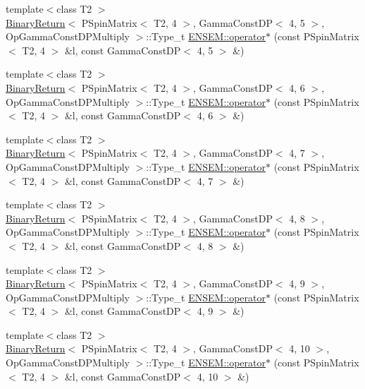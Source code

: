 \begin{DoxyCompactItemize}
\item 
{\footnotesize template$<$class T2 $>$ }\\\mbox{\hyperlink{structBinaryReturn}{Binary\+Return}}$<$ P\+Spin\+Matrix$<$ T2, 4 $>$, Gamma\+Const\+DP$<$ 4, 5 $>$, Op\+Gamma\+Const\+D\+P\+Multiply $>$\+::Type\+\_\+t \mbox{\hyperlink{group__primspinmatrix_gaf7e4830f4ad99e0601dccbd49cb97662}{E\+N\+S\+E\+M\+::operator$\ast$}} (const P\+Spin\+Matrix$<$ T2, 4 $>$ \&l, const Gamma\+Const\+DP$<$ 4, 5 $>$ \&)
\item 
{\footnotesize template$<$class T2 $>$ }\\\mbox{\hyperlink{structBinaryReturn}{Binary\+Return}}$<$ P\+Spin\+Matrix$<$ T2, 4 $>$, Gamma\+Const\+DP$<$ 4, 6 $>$, Op\+Gamma\+Const\+D\+P\+Multiply $>$\+::Type\+\_\+t \mbox{\hyperlink{group__primspinmatrix_gac2a770f56cbf8ef3fd61c80d05ee306e}{E\+N\+S\+E\+M\+::operator$\ast$}} (const P\+Spin\+Matrix$<$ T2, 4 $>$ \&l, const Gamma\+Const\+DP$<$ 4, 6 $>$ \&)
\item 
{\footnotesize template$<$class T2 $>$ }\\\mbox{\hyperlink{structBinaryReturn}{Binary\+Return}}$<$ P\+Spin\+Matrix$<$ T2, 4 $>$, Gamma\+Const\+DP$<$ 4, 7 $>$, Op\+Gamma\+Const\+D\+P\+Multiply $>$\+::Type\+\_\+t \mbox{\hyperlink{group__primspinmatrix_ga4540a205b423306c3a0d322e81d75d2d}{E\+N\+S\+E\+M\+::operator$\ast$}} (const P\+Spin\+Matrix$<$ T2, 4 $>$ \&l, const Gamma\+Const\+DP$<$ 4, 7 $>$ \&)
\item 
{\footnotesize template$<$class T2 $>$ }\\\mbox{\hyperlink{structBinaryReturn}{Binary\+Return}}$<$ P\+Spin\+Matrix$<$ T2, 4 $>$, Gamma\+Const\+DP$<$ 4, 8 $>$, Op\+Gamma\+Const\+D\+P\+Multiply $>$\+::Type\+\_\+t \mbox{\hyperlink{group__primspinmatrix_gaf745fe661bcdf107b27bf22e48d36d3e}{E\+N\+S\+E\+M\+::operator$\ast$}} (const P\+Spin\+Matrix$<$ T2, 4 $>$ \&l, const Gamma\+Const\+DP$<$ 4, 8 $>$ \&)
\item 
{\footnotesize template$<$class T2 $>$ }\\\mbox{\hyperlink{structBinaryReturn}{Binary\+Return}}$<$ P\+Spin\+Matrix$<$ T2, 4 $>$, Gamma\+Const\+DP$<$ 4, 9 $>$, Op\+Gamma\+Const\+D\+P\+Multiply $>$\+::Type\+\_\+t \mbox{\hyperlink{group__primspinmatrix_ga49c2bb9929a1c38be010fe8c661f3720}{E\+N\+S\+E\+M\+::operator$\ast$}} (const P\+Spin\+Matrix$<$ T2, 4 $>$ \&l, const Gamma\+Const\+DP$<$ 4, 9 $>$ \&)
\item 
{\footnotesize template$<$class T2 $>$ }\\\mbox{\hyperlink{structBinaryReturn}{Binary\+Return}}$<$ P\+Spin\+Matrix$<$ T2, 4 $>$, Gamma\+Const\+DP$<$ 4, 10 $>$, Op\+Gamma\+Const\+D\+P\+Multiply $>$\+::Type\+\_\+t \mbox{\hyperlink{group__primspinmatrix_gae0a36eebbac7cf857f48a6bd7966e139}{E\+N\+S\+E\+M\+::operator$\ast$}} (const P\+Spin\+Matrix$<$ T2, 4 $>$ \&l, const Gamma\+Const\+DP$<$ 4, 10 $>$ \&)

\end{DoxyCompactItemize}
